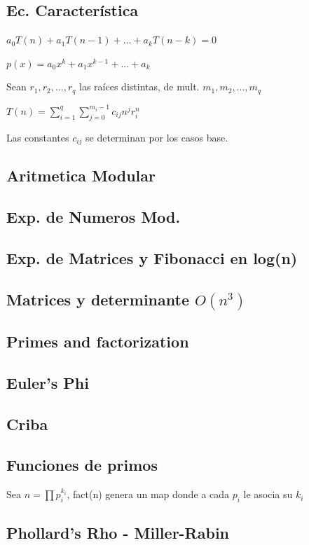 \subsection{Ec. Característica}
$a_0T(n)+a_1T(n-1)+...+a_kT(n-k)=0$

$p(x)=a_0 x^k + a_1 x^{k-1} + ... + a_k$

Sean $r_1,r_2,...,r_q$ las raíces distintas, de mult. $m_1, m_2, ..., m_q$

$T(n)=\sum_{i=1}^q{\sum_{j=0}^{m_i - 1}c_{ij} n^j r_i^n}$

Las constantes $c_{ij}$ se determinan por los casos base.
\subsection{Aritmetica Modular}
\subsection{Exp. de Numeros Mod.}
\subsection{Exp. de Matrices y Fibonacci en log(n)}
\subsection{Matrices y determinante $O(n^3)$}
\subsection{Primes and factorization}
\subsection{Euler's Phi}
\subsection{Criba}
\subsection{Funciones de primos}
Sea $n=\prod{p_i^{k_i}}$, fact(n) genera un map donde a cada $p_i$ le asocia su $k_i$
\subsection{Phollard's Rho - Miller-Rabin}
